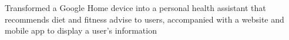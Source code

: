 \documentclass[letterpaper]{deedy-resume} %
\begin{document}
\begin{minipage}[t]{0.66\textwidth}

\begin{tightitemize}
\item Transformed a Google Home device into a personal health assistant that recommends diet and fitness advise to users, accompanied with a website and mobile app to display a user's information
\end{tightitemize}


\end{minipage} %








\end{document}
